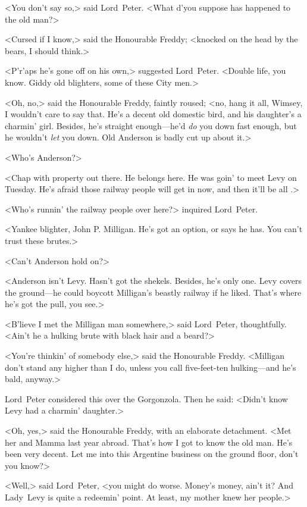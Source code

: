<You don't say so,> said Lord~Peter. <What d'you suppose has happened to the old man?>

<Cursed if I know,> said the Honourable Freddy; <knocked on the head by the bears, I should think.>

<P'r'aps he's gone off on his own,> suggested Lord~Peter. <Double life, you know. Giddy old blighters, some of these City men.>

<Oh, no,> said the Honourable Freddy, faintly roused; <no, hang it all, Wimsey, I wouldn't care to say that. He's a decent old domestic bird, and his daughter's a charmin' girl. Besides, he's straight enough—he'd \emph{do} you down fast enough, but he wouldn't \emph{let} you down. Old Anderson is badly cut up about it.>

<Who's Anderson?>

<Chap with property out there. He belongs here. He was goin' to meet Levy on Tuesday. He's afraid those railway people will get in now, and then it'll be all .>

<Who's runnin' the railway people over here?> inquired Lord~Peter.

<Yankee blighter, John P\@. Milligan. He's got an option, or says he has. You can't trust these brutes.>

<Can't Anderson hold on?>

<Anderson isn't Levy. Hasn't got the shekels. Besides, he's only one. Levy covers the ground—he could boycott Milligan's beastly railway if he liked. That's where he's got the pull, you see.>

<B'lieve I met the Milligan man somewhere,> said Lord~Peter, thoughtfully. <Ain't he a hulking brute with black hair and a beard?>

<You're thinkin' of somebody else,> said the Honourable Freddy. <Milligan don't stand any higher than I do, unless you call five-feet-ten hulking—and he's bald, anyway.>

Lord~Peter considered this over the Gorgonzola. Then he said: <Didn't know Levy had a charmin' daughter.>

<Oh, yes,> said the Honourable Freddy, with an elaborate detachment. <Met her and Mamma last year abroad. That's how I got to know the old man. He's been very decent. Let me into this Argentine business on the ground floor, don't you know?>

<Well,> said Lord~Peter, <you might do worse. Money's money, ain't it? And Lady~Levy is quite a redeemin' point. At least, my mother knew her people.>

